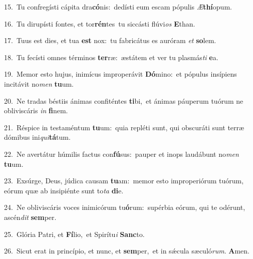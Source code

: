 {\numbfont\textcolor{\numbcolor}{15.}}~Tu confregísti cápita dra\-\textbf{có}\-nis:~\star dedísti eum escam pópulis \textit{Æ}\-\textbf{thí}opum.\par
{\numbfont\textcolor{\numbcolor}{16.}}~Tu dirupísti fontes, et tor\-\textbf{rén}\-tes~\star tu siccásti flúvi\textit{os} \textbf{E}\-than.\par
{\numbfont\textcolor{\numbcolor}{17.}}~Tuus est dies, et tua \textbf{est} nox:~\star tu fabricátus es auróram \textit{et} \textbf{so}\-lem.\par
{\numbfont\textcolor{\numbcolor}{18.}}~Tu fecísti omnes términos \textbf{ter}\-ræ:~\star æstátem et ver tu plasmás\textit{ti} \textbf{e}\-a.\par
{\numbfont\textcolor{\numbcolor}{19.}}~Memor esto hujus, inimícus improperávit \textbf{Dó}\-mino:~\star et pópulus insípiens incitávit no\textit{men} \textbf{tu}\-um.\par
{\numbfont\textcolor{\numbcolor}{20.}}~Ne tradas béstiis ánimas confiténtes \textbf{ti}\-bi,~\star et ánimas páuperum tuórum ne obliviscáris \textit{in} \textbf{fi}\-nem.\par
{\numbfont\textcolor{\numbcolor}{21.}}~Réspice in testaméntum \textbf{tu}\-um:~\star quia repléti sunt, qui obscuráti sunt terræ dómibus ini\-\textit{qui}\-\textbf{tá}tum.\par
{\numbfont\textcolor{\numbcolor}{22.}}~Ne avertátur húmilis factus con\-\textbf{fú}\-sus:~\star pauper et inops laudábunt no\textit{men} \textbf{tu}\-um.\par
{\numbfont\textcolor{\numbcolor}{23.}}~Exsúrge, Deus, júdica causam \textbf{tu}\-am:~\star memor esto improperiórum tuórum, eórum quæ ab insipiénte sunt to\textit{ta} \textbf{di}\-e.\par
{\numbfont\textcolor{\numbcolor}{24.}}~Ne obliviscáris voces inimicórum tu\-\textbf{ó}\-rum:~\star supérbia eórum, qui te odérunt, ascén\textit{dit} \textbf{sem}\-per.\par
{\numbfont\textcolor{\numbcolor}{25.}}~Glória Patri, et \textbf{Fí}\-lio,~\star et Spirítu\textit{i} \textbf{Sanc}\-to.\par
{\numbfont\textcolor{\numbcolor}{26.}}~Sicut erat in princípio, et nunc, et \textbf{sem}\-per,~\star et in sǽcula sæculó\-\textit{rum}\-. \textbf{A}\-men.\par
